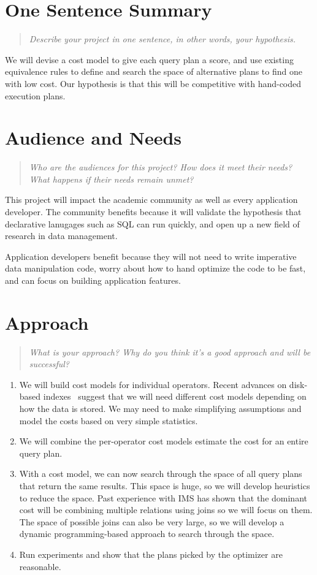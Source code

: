 \documentclass{proc}
\begin{document}
\section{One Sentence Summary}
\begin{quote}
\emph{Describe your project in one sentence, in other words, your hypothesis.}
\end{quote}

We will devise a cost model to give each query plan a score, and use existing equivalence rules to define and search the space of alternative plans to find one with low cost.  Our hypothesis is that this will be competitive with hand-coded execution plans.

\section{Audience and Needs}
\begin{quote}
\emph{Who are the audiences for this project? 
How does it meet their needs? 
What happens if their needs remain unmet?}
\end{quote}

This project will impact the academic community as well as every application developer.
The community benefits because it will validate the hypothesis that declarative lanugages such as SQL can run quickly, and open up a new field of research in data management.

Application developers benefit because they will not need to write imperative data manipulation code, worry about how to hand optimize the code to be fast, and can focus on building application features.

\section{Approach}
\begin{quote}
\emph{What is your approach?
Why do you think it's a good approach and will be successful?}
\end{quote}

\begin{enumerate}
\item We will build cost models for individual operators.  Recent advances on disk-based indexes~\cite{bayer2002organization} suggest that we will need different cost models depending on how the data is stored.  We may need to make simplifying assumptions and model the costs based on very simple statistics.
\item We will combine the per-operator cost models estimate the cost for an entire query plan.
\item With a cost model, we can now search through the space of all query plans that return the same results.  This space is huge, so we will develop heuristics to reduce the space.   Past experience with IMS has shown that the dominant cost will be combining multiple relations using joins so we will focus on them. The space of possible joins can also be very large, so we will develop a dynamic programming-based approach to search through the space.
\item Run experiments and show that the plans picked by the optimizer are reasonable.
\end{enumerate}
\end{document}
